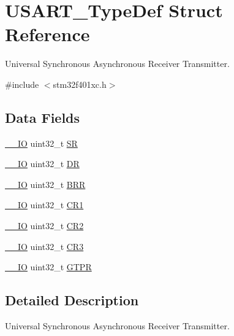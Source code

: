 \hypertarget{struct_u_s_a_r_t___type_def}{}\section{U\+S\+A\+R\+T\+\_\+\+Type\+Def Struct Reference}
\label{struct_u_s_a_r_t___type_def}


Universal Synchronous Asynchronous Receiver Transmitter.  




{\ttfamily \#include $<$stm32f401xc.\+h$>$}

\subsection*{Data Fields}
\begin{DoxyCompactItemize}
\item 
\hyperlink{core__sc300_8h_aec43007d9998a0a0e01faede4133d6be}{\+\_\+\+\_\+\+IO} uint32\+\_\+t \hyperlink{struct_u_s_a_r_t___type_def_af6aca2bbd40c0fb6df7c3aebe224a360}{SR}
\item 
\hyperlink{core__sc300_8h_aec43007d9998a0a0e01faede4133d6be}{\+\_\+\+\_\+\+IO} uint32\+\_\+t \hyperlink{struct_u_s_a_r_t___type_def_a3df0d8dfcd1ec958659ffe21eb64fa94}{DR}
\item 
\hyperlink{core__sc300_8h_aec43007d9998a0a0e01faede4133d6be}{\+\_\+\+\_\+\+IO} uint32\+\_\+t \hyperlink{struct_u_s_a_r_t___type_def_a092e59d908b2ca112e31047e942340cb}{B\+RR}
\item 
\hyperlink{core__sc300_8h_aec43007d9998a0a0e01faede4133d6be}{\+\_\+\+\_\+\+IO} uint32\+\_\+t \hyperlink{struct_u_s_a_r_t___type_def_ab0ec7102960640751d44e92ddac994f0}{C\+R1}
\item 
\hyperlink{core__sc300_8h_aec43007d9998a0a0e01faede4133d6be}{\+\_\+\+\_\+\+IO} uint32\+\_\+t \hyperlink{struct_u_s_a_r_t___type_def_afdfa307571967afb1d97943e982b6586}{C\+R2}
\item 
\hyperlink{core__sc300_8h_aec43007d9998a0a0e01faede4133d6be}{\+\_\+\+\_\+\+IO} uint32\+\_\+t \hyperlink{struct_u_s_a_r_t___type_def_add5b8e29a64c55dcd65ca4201118e9d1}{C\+R3}
\item 
\hyperlink{core__sc300_8h_aec43007d9998a0a0e01faede4133d6be}{\+\_\+\+\_\+\+IO} uint32\+\_\+t \hyperlink{struct_u_s_a_r_t___type_def_a5dd0cb6c861eaf26470f56f451c1edbf}{G\+T\+PR}
\end{DoxyCompactItemize}


\subsection{Detailed Description}
Universal Synchronous Asynchronous Receiver Transmitter. 

